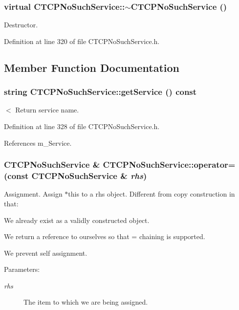\subsubsection{\setlength{\rightskip}{0pt plus 5cm}virtual CTCPNo\-Such\-Service::$\sim$CTCPNo\-Such\-Service ()\hspace{0.3cm}{\tt  [inline, virtual]}}\label{classCTCPNoSuchService_a2}


Destructor.



Definition at line 320 of file CTCPNo\-Such\-Service.h.

\subsection{Member Function Documentation}
\subsubsection{\setlength{\rightskip}{0pt plus 5cm}string CTCPNo\-Such\-Service::get\-Service () const\hspace{0.3cm}{\tt  [inline]}}\label{classCTCPNoSuchService_a5}


$<$ Return service name.



Definition at line 328 of file CTCPNo\-Such\-Service.h.

References m\_\-Service.
\subsubsection{\setlength{\rightskip}{0pt plus 5cm}CTCPNo\-Such\-Service \& CTCPNo\-Such\-Service::operator= (const CTCPNo\-Such\-Service \& {\em rhs})}\label{classCTCPNoSuchService_a3}


Assignment. Assign $\ast$this to a rhs object. Different from copy construction in that:\begin{CompactItemize}
\item 
We already exist as a validly constructed object.\item 
We return a reference to ourselves so that = chaining is supported.\item 
We prevent self assignment.\end{CompactItemize}
\begin{Desc}
\item[Parameters: ]\par
\begin{description}
\item[{\em 
rhs}]The item to which we are being assigned. \end{description}
\end{Desc}


